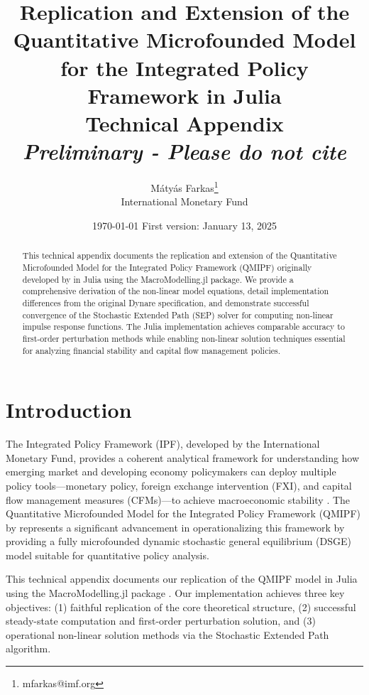 \documentclass[12pt]{article}
\title{Replication and Extension of the Quantitative Microfounded Model\\for the Integrated Policy Framework in Julia\\\vspace{0.5cm}\large{Technical Appendix} \\\vspace{0.5cm} \it Preliminary - Please do not cite}
\author{M\'aty\'as Farkas\thanks{mfarkas@imf.org}\\
{\small {International Monetary Fund}}}
\date{\today}
\date{\vspace{0.0cm}   First version: January 13, 2025}
\begin{document}
\maketitle

\begin{abstract}
\noindent This technical appendix documents the replication and extension of the Quantitative Microfounded Model for the Integrated Policy Framework (QMIPF) originally developed by \citet{adrian2021quantitative} in Julia using the MacroModelling.jl package. We provide a comprehensive derivation of the non-linear model equations, detail implementation differences from the original Dynare specification, and demonstrate successful convergence of the Stochastic Extended Path (SEP) solver for computing non-linear impulse response functions. The Julia implementation achieves comparable accuracy to first-order perturbation methods while enabling non-linear solution techniques essential for analyzing financial stability and capital flow management policies.
\end{abstract}

\vspace{1cm}

\tableofcontents

\newpage

\section{Introduction}

The Integrated Policy Framework (IPF), developed by the International Monetary Fund, provides a coherent analytical framework for understanding how emerging market and developing economy policymakers can deploy multiple policy tools---monetary policy, foreign exchange intervention (FXI), and capital flow management measures (CFMs)---to achieve macroeconomic stability \citep{adrian2020conceptual}. The Quantitative Microfounded Model for the Integrated Policy Framework (QMIPF) by \citet{adrian2021quantitative} represents a significant advancement in operationalizing this framework by providing a fully microfounded dynamic stochastic general equilibrium (DSGE) model suitable for quantitative policy analysis.

This technical appendix documents our replication of the QMIPF model in Julia using the MacroModelling.jl package \citep{MacroModellingJL}. Our implementation achieves three key objectives: (1) faithful replication of the core theoretical structure, (2) successful steady-state computation and first-order perturbation solution, and (3) operational non-linear solution methods via the Stochastic Extended Path algorithm.
\end{document}
